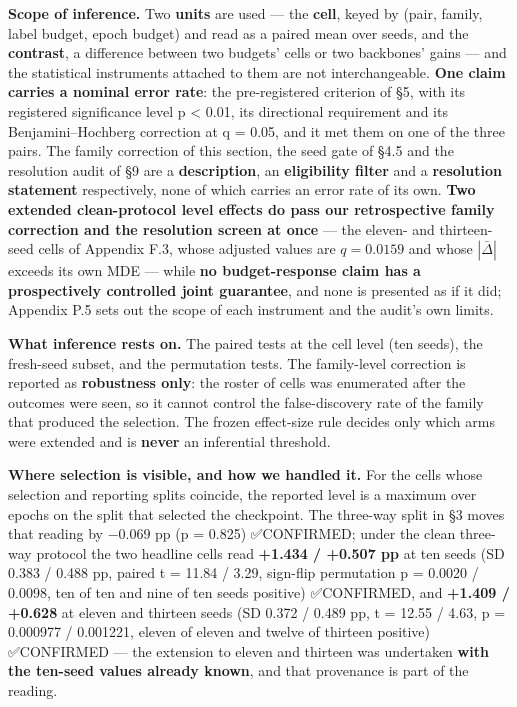 \documentclass[pdflatex,sn-mathphys-ay]{sn-jnl}
\begin{document}
\textbf{Scope of inference.} Two \textbf{units} are used --- the \textbf{cell}, keyed by (pair, family, label budget, epoch budget) and read as a paired mean over seeds, and the \textbf{contrast}, a difference between two budgets' cells or two backbones' gains --- and the statistical instruments attached to them are not interchangeable. \textbf{One claim carries a nominal error rate}: the pre-registered criterion of \S{}5, with its registered significance level p \textless{} 0.01, its directional requirement and its Benjamini--Hochberg correction at q = 0.05, and it met them on one of the three pairs. The family correction of this section, the seed gate of \S{}4.5 and the resolution audit of \S{}9 are a \textbf{description}, an \textbf{eligibility filter} and a \textbf{resolution statement} respectively, none of which carries an error rate of its own. \textbf{Two extended clean-protocol level effects do pass our retrospective family correction and the resolution screen at once} --- the eleven- and thirteen-seed cells of Appendix F.3, whose adjusted values are $q=0.0159$ and whose $|\bar\Delta|$ exceeds its own MDE --- while \textbf{no budget-response claim has a prospectively controlled joint guarantee}, and none is presented as if it did; Appendix P.5 sets out the scope of each instrument and the audit's own limits.

\textbf{What inference rests on.} The paired tests at the cell level (ten seeds), the fresh-seed subset, and the permutation tests. The family-level correction is reported as \textbf{robustness only}: the roster of cells was enumerated after the outcomes were seen, so it cannot control the false-discovery rate of the family that produced the selection. The frozen effect-size rule decides only which arms were extended and is \textbf{never} an inferential threshold.

\textbf{Where selection is visible, and how we handled it.} For the cells whose selection and reporting splits coincide, the reported level is a maximum over epochs on the split that selected the checkpoint. The three-way split in \S{}3 moves that reading by \ensuremath{-}0.069 pp (p = 0.825) ✅CONFIRMED; under the clean three-way protocol the two headline cells read \textbf{+1.434 / +0.507 pp} at ten seeds (SD 0.383 / 0.488 pp, paired t = 11.84 / 3.29, sign-flip permutation p = 0.0020 / 0.0098, ten of ten and nine of ten seeds positive) ✅CONFIRMED, and \textbf{+1.409 / +0.628} at eleven and thirteen seeds (SD 0.372 / 0.489 pp, t = 12.55 / 4.63, p = 0.000977 / 0.001221, eleven of eleven and twelve of thirteen positive) ✅CONFIRMED --- the extension to eleven and thirteen was undertaken \textbf{with the ten-seed values already known}, and that provenance is part of the reading.
\end{document}
